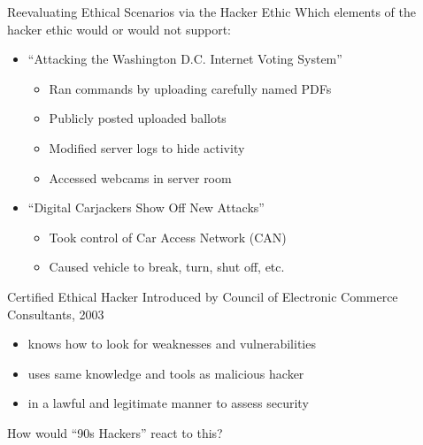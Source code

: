 \documentclass{beamer}
\begin{document}
\begin{frame}{Reevaluating Ethical Scenarios via the Hacker Ethic}
Which elements of the hacker ethic would or would not support:\\[1em]
\begin{itemize}
\item ``Attacking the Washington D.C. Internet Voting System''
\begin{itemize}
\item<2-> Ran commands by uploading carefully named PDFs
\item<2-> Publicly posted uploaded ballots
\item<2-> Modified server logs to hide activity
\item<2-> Accessed webcams in server room
\end{itemize}
\item ``Digital Carjackers Show Off New Attacks''
\begin{itemize}
\item<2-> Took control of Car Access Network (CAN)
\item<2-> Caused vehicle to break, turn, shut off, etc.
\end{itemize}
\end{itemize}
\end{frame}

\begin{frame}{Certified Ethical Hacker}
Introduced by Council of Electronic Commerce Consultants, 2003
\begin{itemize}
\item knows how to look for weaknesses and vulnerabilities
\item uses same knowledge and tools as malicious hacker
\item in a lawful and legitimate manner to assess security
\end{itemize}
\pause
\bigskip
How would ``90s Hackers'' react to this?
\end{frame}
\end{document}
